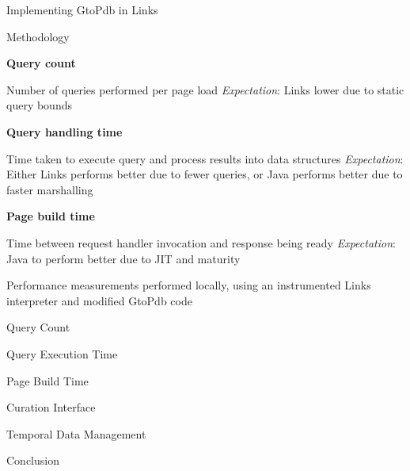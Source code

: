 \documentclass[11.5pt, aspectratio=169]{beamer}
\begin{document}
\begin{frame}{Implementing GtoPdb in Links}
\end{frame}


\begin{frame}{Methodology}

  \begin{fullpageitemize}
  \item {\Large \textbf{Query count} }
    \begin{itemize}
      \itemR Number of queries performed per page load
      \itemR \emph{Expectation}: Links lower due to static query bounds
    \end{itemize}
    \vspace{1em}
  \item {\Large \textbf{Query handling time} }
    \begin{itemize}
      \itemR Time taken to execute query and process results into data
        structures
      \itemR \emph{Expectation}: Either Links performs better due to fewer queries, or
        Java performs better due to faster marshalling
    \end{itemize}
    \vspace{1em}

  \item {\Large \textbf{Page build time} }
    \begin{itemize}
      \itemR Time between request handler invocation and response being ready
      \itemR \emph{Expectation}: Java to perform better due to JIT and maturity
    \end{itemize}

  \end{fullpageitemize}
    \vspace{1em}

  Performance measurements performed locally, using an instrumented Links
  interpreter and modified GtoPdb code
\end{frame}

\begin{frame}{Query Count}
\end{frame}

\begin{frame}{Query Execution Time}
\end{frame}

\begin{frame}{Page Build Time}
\end{frame}


\begin{frame}{Curation Interface}
\end{frame}

\begin{frame}{Temporal Data Management}
\end{frame}

\begin{frame}{Conclusion}
\end{frame}
\end{document}

